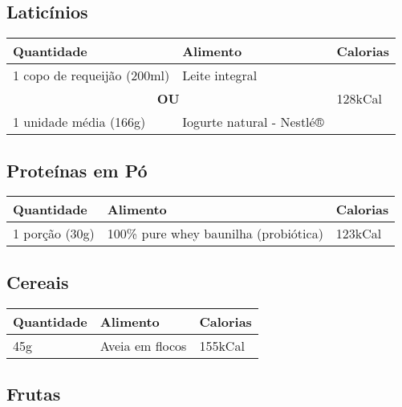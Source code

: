 \subsection*{Laticínios}

\begin{tabular}{p{8cm}p{8cm}p{1.5cm}}
\toprule
\textbf{Quantidade} & \textbf{Alimento} & \textbf{Calorias} \\
\midrule
1 copo de requeijão (200ml) & Leite integral & \multirow{4}{*}{128kCal} \\
\cmidrule(lr){1-2}
\multicolumn{2}{c}{\textbf{OU}} \\
\cmidrule(lr){1-2}
1 unidade média (166g) & Iogurte natural - Nestlé®\\
\bottomrule
\end{tabular}

\subsection*{Proteínas em Pó}

\begin{tabular}{p{8cm}p{8cm}p{1.5cm}}
\toprule
\textbf{Quantidade} & \textbf{Alimento} & \textbf{Calorias} \\
\midrule
1 porção (30g) & 100\% pure whey baunilha (probiótica) & 123kCal \\
\bottomrule
\end{tabular}

\subsection*{Cereais}

\begin{tabular}{p{8cm}p{8cm}p{1.5cm}}
\toprule
\textbf{Quantidade} & \textbf{Alimento} & \textbf{Calorias} \\
\midrule
45g & Aveia em flocos & 155kCal \\
\bottomrule
\end{tabular}

\subsection*{Frutas}

